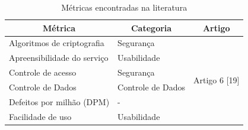 \documentclass[conference]{IEEEtran}
\begin{document}
\begin{table}[]
\centering
 \caption{Métricas encontradas na literatura}
\label{tab:metricas_literatura}
\begin{tabular}{lll}
\hline
\multicolumn{1}{c}{\textbf{Métrica}}                                                       & \multicolumn{1}{c}{\textbf{Categoria}}                                                                    & \multicolumn{1}{c}{\textbf{Artigo}}                                                    \\ \hline
Algoritmos de criptografia                                                                   & Segurança                                                                                                  & \multirow{9}{*}{Artigo 6 [19]}                                                          \\ \cline{1-2}
Apreensibilidade do serviço                                                                  & Usabilidade                                                                                                &                                                                                         \\ \cline{1-2}
Controle de acesso                                                                           & Segurança                                                                                                  &                                                                                         \\ \cline{1-2}
Controle de Dados                                                                            & Controle de Dados                                                                                          &                                                                                         \\ \cline{1-2}
Defeitos por milhão (DPM)                                                                    & -                                                                                                          &                                                                                         \\ \cline{1-2}
Facilidade de uso                                                                            & Usabilidade                                                                                                &                                                                                         \\ \cline{1-2}

\end{tabular}
\end{table}
\end{document}
